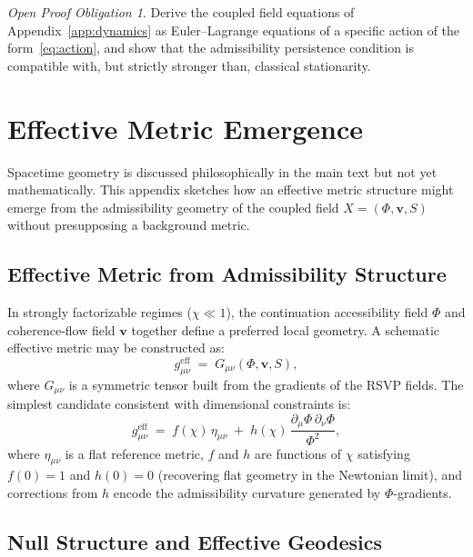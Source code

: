 \documentclass[11pt, a4paper]{article}
\theoremstyle{plain}
\theoremstyle{definition}
\theoremstyle{remark}
\newtheorem{obligation}[theorem]{Open Proof Obligation}
\begin{document}
\begin{obligation}
\label{obl:variational}
Derive the coupled field equations of Appendix~\ref{app:dynamics} as Euler--Lagrange
equations of a specific action of the form~\eqref{eq:action}, and show that the
admissibility persistence condition is compatible with, but strictly stronger than,
classical stationarity.
\end{obligation}

\section{Effective Metric Emergence}
\label{app:metric}

Spacetime geometry is discussed philosophically in the main text but not yet
mathematically. This appendix sketches how an effective metric structure might emerge
from the admissibility geometry of the coupled field $X = (\Phi, \mathbf{v}, S)$
without presupposing a background metric.

\subsection{Effective Metric from Admissibility Structure}

In strongly factorizable regimes ($\chi \ll 1$), the continuation accessibility
field $\Phi$ and coherence-flow field $\mathbf{v}$ together define a preferred local
geometry. A schematic effective metric may be constructed as:
\begin{equation}
  \label{eq:effmetric}
  g_{\mu\nu}^{\mathrm{eff}} \;=\; G_{\mu\nu}(\Phi, \mathbf{v}, S),
\end{equation}
where $G_{\mu\nu}$ is a symmetric tensor built from the gradients of the RSVP fields.
The simplest candidate consistent with dimensional constraints is:
\[
  g_{\mu\nu}^{\mathrm{eff}} \;=\; f(\chi)\,\eta_{\mu\nu}
    \;+\; h(\chi)\,\frac{\partial_\mu\Phi\,\partial_\nu\Phi}{\Phi^2},
\]
where $\eta_{\mu\nu}$ is a flat reference metric, $f$ and $h$ are functions of
$\chi$ satisfying $f(0) = 1$ and $h(0) = 0$ (recovering flat geometry in the
Newtonian limit), and corrections from $h$ encode the admissibility curvature
generated by $\Phi$-gradients.

\subsection{Null Structure and Effective Geodesics}
\end{document}

